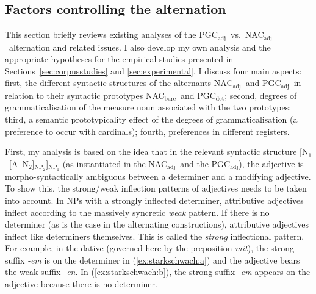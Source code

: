 \documentclass[USenglish]{article}
\newcommand{\Sub}[1]{\ensuremath{\mathrm{_{#1}}}}
\newcommand{\NACb}{NAC\Sub{bare}}
\newcommand{\NACa}{NAC\Sub{adj}}
\newcommand{\PGCd}{PGC\Sub{det}}
\newcommand{\PGCa}{PGC\Sub{adj}}
\begin{document}
\subsection{Factors controlling the alternation}
\label{sec:analyses}

This section briefly reviews existing analyses of the \PGCa\ vs.\ \NACa\ alternation and related issues.
I also develop my own analysis and the appropriate hypotheses for the empirical studies presented in Sections~\ref{sec:corpusstudies} and \ref{sec:experimental}.
I discuss four main aspects:
first, the different syntactic structures of the alternants \NACa\ and \PGCa\ in relation to their syntactic prototypes \NACb\ and \PGCd;
second, degrees of grammaticalisation of the measure noun associated with the two prototypes;
third, a semantic prototypicality effect of the degrees of grammaticalisation (a preference to occur with cardinals);
fourth, preferences in different registers.


First, my analysis is based on the idea that in the relevant syntactic structure [N\Sub{1}~[A~N\Sub{2}]\Sub{NP\Sub{2}}]\Sub{NP\Sub{1}} (as instantiated in the \NACa\ and the \PGCa), the adjective is morpho-syntactically ambiguous between a determiner and a modifying adjective.
To show this, %
the strong\slash weak inflection patterns of adjectives needs to be taken into account.
In NPs with a strongly inflected determiner, attributive adjectives inflect according to the massively syncretic \textit{weak} pattern.
If there is no determiner (as is the case in the alternating constructions), attributive adjectives inflect like determiners themselves.
This is called the \textit{strong} inflectional pattern.
For example, in the dative (governed here by the preposition \textit{mit}), the strong suffix \textit{-em} is on the determiner in (\ref{ex:starkschwach:a}) and the adjective bears the weak suffix \textit{-en}. 
In (\ref{ex:starkschwach:b}), the strong suffix \textit{-em} appears on the adjective because there is no determiner.
\end{document}
